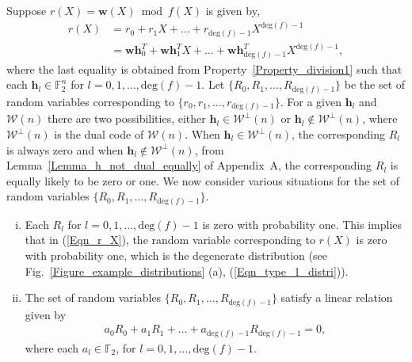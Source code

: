 \documentclass[10pt,journal]{IEEEtran}
\def \deg{{\mathrm{deg}}}
\def \Fig {Fig.}
\begin{document}
\begin{IEEEproof}
% 
Suppose $r(X) = \mathbf{w}(X) \bmod f(X)$ is given by,
% 
\begin{equation}
%  
\begin{aligned}
%  
r(X) &= r_0 +r_1X + \ldots + r_{{\deg(f)}-1}X^{{\deg(f)}-1} \\ 
	      &= \mathbf{w}\mathbf{h}_0^T +\mathbf{w}\mathbf{h}_1^T X + \ldots + \mathbf{w}\mathbf{h}_{{\deg(f)}-1}^TX^{{\deg(f)}-1},
\label{Eqn_r_X}
% 
\end{aligned}
% 
\end{equation}
% 
where the last equality is obtained from Property~\ref{Property_division1} such that each $\mathbf{h}_l \in \mathbb{F}_2^n$
for $l = 0,1,\ldots,\deg(f)-1$.
% 
Let $\{ R_0, R_1, \ldots, R_{\deg(f)-1} \}$ be the set of random variables corresponding to 
$\{ r_0, r_1, \ldots, r_{\deg(f)-1} \}$.
% 
For a given $\mathbf{h}_l$ and $\mathcal{W}(n)$ there are two possibilities, either $\mathbf{h}_l \in \mathcal{W}^{\perp}(n)$
or $\mathbf{h}_l \notin \mathcal{W}^{\perp}(n)$, where $\mathcal{W}^{\perp}(n)$ is the dual code of $\mathcal{W}(n)$.
When $\mathbf{h}_l \in \mathcal{W}^{\perp}(n)$, the corresponding $R_l$ is always zero and 
when $\mathbf{h}_l \notin \mathcal{W}^{\perp}(n)$, 
from Lemma~\ref{Lemma_h_not_dual_equally} of Appendix~A,
the corresponding $R_l$ is equally likely to be zero or one.
We now consider various situations for the set of random variables $\{ R_0, R_1, \ldots, R_{\deg(f)-1} \}$.
% 
\begin{enumerate} [(i)]
%  
\item Each $R_l$ for $l = 0, 1, \ldots, \deg(f)-1$ is zero with probability one. 
This implies that in (\ref{Eqn_r_X}), the random variable corresponding to $r(X)$ is zero with probability one, which is  
the degenerate distribution (see \Fig~\ref{Figure_example_distributions} (a), (\ref{Eqn_type_1_distri})).
% 
\item The set of random variables $\{ R_0, R_1, \ldots, R_{\deg(f)-1} \}$ satisfy a linear relation given by
% 
\begin{align}
%  
a_0R_0 + a_1 R_1 + \ldots + a_{\deg(f)-1} R_{\deg(f)-1} = 0,
\label{Eqn_r_i_lin_combi_pre1}
% 
\end{align}
% 
where each $a_l \in \mathbb{F}_2$, for $l = 0, 1, \ldots, \deg(f)-1$.

\end{enumerate}
\end{IEEEproof}
\end{document}
